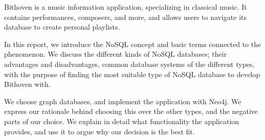 
Bithoven is a music information application, specializing in classical music. It
contains performances, composers, and more, and allows users to navigate its
database to create personal playlists.

In this report, we introduce the NoSQL concept and basic terms connected to the
phenomenon. We discuss the different kinds of NoSQL databases; their advantages
and disadvantages, common database systems of the different types, with the
purpose of finding the most suitable type of NoSQL database to develop Bithoven
with.

We choose graph databases, and implement the application with Neo4j. We express
our rationale behind choosing this over the other types, and the negative parts
of our choice. We explain in detail what functionality the application provides,
and use it to argue why our decision is the best fit.
